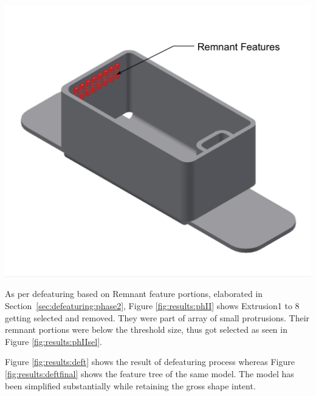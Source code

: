 \begin{minipage}{\linewidth}
\begin{minipage}[c]{0.62\linewidth}
\includegraphics[width=\linewidth,valign=t]{images/SheetMetal_Medium_Enclosure_PhaseIISelections_3}
 \label{fig:results:phII}


As per defeaturing based on Remnant feature portions, elaborated in Section~\ref{sec:defeaturing:phase2}, Figure \ref{fig:results:phII} shows Extrusion1 to 8 getting selected and removed. They were part of array of small protrusions. Their remnant portions were below the threshold size, thus got selected as seen in Figure \ref{fig:results:phIIsel}. %

Figure \ref{fig:results:deft} shows the result of defeaturing process whereas Figure \ref{fig:results:deftfinal} shows the feature tree of the same model. The model has been simplified substantially while retaining the gross shape intent.


\end{minipage}
\end{minipage}
